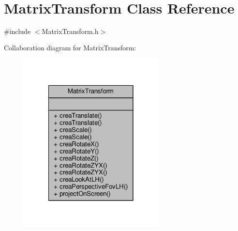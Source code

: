 \hypertarget{classMatrixTransform}{\section{Matrix\-Transform Class Reference}
\label{classMatrixTransform}
}


{\ttfamily \#include $<$Matrix\-Transform.\-h$>$}



Collaboration diagram for Matrix\-Transform\-:
\nopagebreak
\begin{figure}[H]
\begin{center}
\leavevmode
\includegraphics[width=210pt]{classMatrixTransform__coll__graph}
\end{center}
\end{figure}
